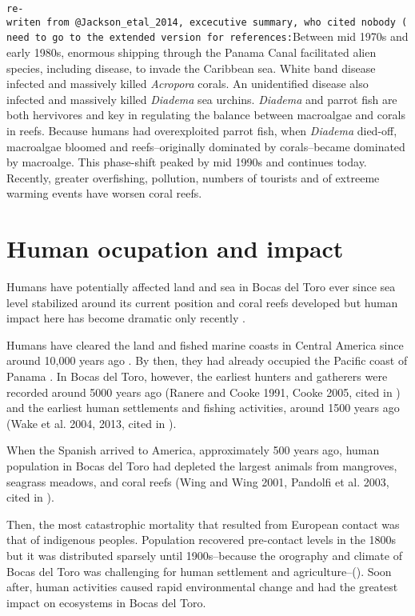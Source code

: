 \documentclass[]{book}
\begin{document}
\texttt{re-writen\ from\ @Jackson\_etal\_2014,\ excecutive\ summary,\ who\ cited\ nobody\ (need\ to\ go\ to\ the\ extended\ version\ for\ references:}Between
mid 1970s and early 1980s, enormous shipping through the Panama Canal
facilitated alien species, including disease, to invade the Caribbean
sea. White band disease infected and massively killed \emph{Acropora}
corals. An unidentified disease also infected and massively killed
\emph{Diadema} sea urchins. \emph{Diadema} and parrot fish are both
hervivores and key in regulating the balance between macroalgae and
corals in reefs. Because humans had overexploited parrot fish, when
\emph{Diadema} died-off, macroalgae bloomed and reefs--originally
dominated by corals--became dominated by macroalge. This phase-shift
peaked by mid 1990s and continues today. Recently, greater overfishing,
pollution, numbers of tourists and of extreeme warming events have
worsen coral reefs.

\section{Human ocupation and impact}\label{human-ocupation-and-impact}

Humans have potentially affected land and sea in Bocas del Toro ever
since sea level stabilized around its current position and coral reefs
developed but human impact here has become dramatic only recently
\citep{Cramer_2013}.

Humans have cleared the land and fished marine coasts in Central America
since around 10,000 years ago \citep{Cramer_2013}. By then, they had
already occupied the Pacific coast of Panama \citep{Fredston_etal_2013}.
In Bocas del Toro, however, the earliest hunters and gatherers were
recorded around 5000 years ago (Ranere and Cooke 1991, Cooke 2005, cited
in \citet{Fredston_etal_2013}) and the earliest human settlements and
fishing activities, around 1500 years ago (Wake et al. 2004, 2013, cited
in \citet{Fredston_etal_2013}).

When the Spanish arrived to America, approximately 500 years ago, human
population in Bocas del Toro had depleted the largest animals from
mangroves, seagrass meadows, and coral reefs (Wing and Wing 2001,
Pandolfi et al. 2003, cited in \citet{Cramer_2013}).

Then, the most catastrophic mortality that resulted from European
contact was that of indigenous peoples. Population recovered pre-contact
levels in the 1800s \citep{Cramer_2013} but it was distributed sparsely
until 1900s--because the orography and climate of Bocas del Toro was
challenging for human settlement and agriculture--(\citet{Cramer_2013}).
Soon after, human activities caused rapid environmental change and had
the greatest impact on ecosystems in Bocas del Toro.
\end{document}
